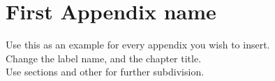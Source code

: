 \chapter{First Appendix name}
\label{app:appendix1}

Use this as an example for every appendix you wish to insert.\\
Change the label name, and the chapter title.\\
Use sections and other for further subdivision.\\
